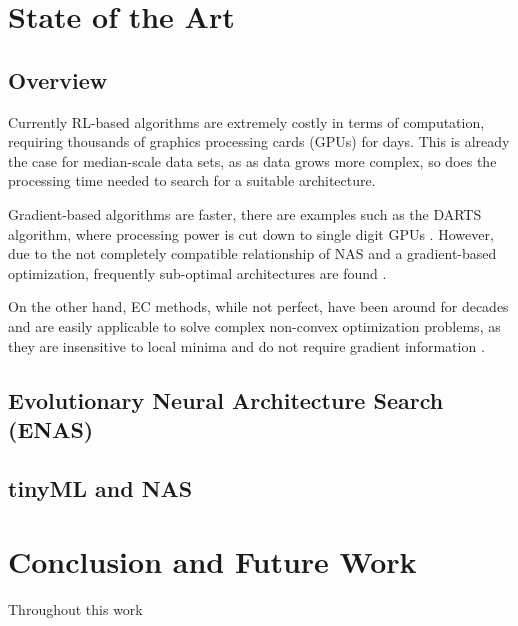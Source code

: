\documentclass[10pt,        %
               a4paper,     %
               journal,     %
               ]{IEEEtran}
\begin{document}
\section{State of the Art}
\label{SOA}

\subsection{Overview}
Currently RL-based algorithms are extremely costly in terms of computation, requiring thousands of
graphics processing cards (GPUs) for days. This is already the case for median-scale data sets, as
as data grows more complex, so does the processing time needed to search for a suitable architecture.

Gradient-based algorithms are faster, there are examples such as the DARTS algorithm, where processing power
is cut down to single digit GPUs \cite{liu2018darts}. However, due to the not completely compatible relationship
of NAS and a gradient-based optimization, frequently sub-optimal architectures are found \cite{liu2021survey}.

On the other hand, EC methods, while not perfect, have been around for decades and are easily applicable
to solve complex non-convex optimization problems, as they are insensitive to local minima and do not require
gradient information \cite{liu2021survey}.

\subsection{Evolutionary Neural Architecture Search (ENAS)}
\label{EV}

\subsection{tinyML and NAS}

\section{Conclusion and Future Work}
Throughout this work

\newpage



%
\end{document}
